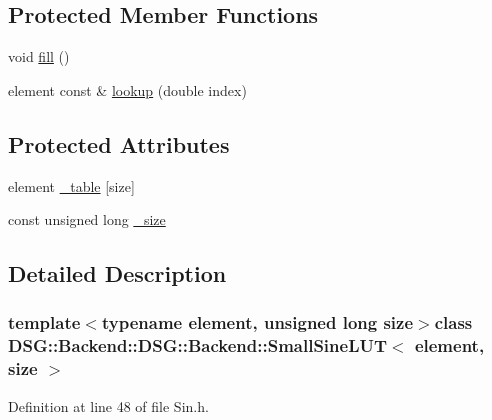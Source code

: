 \subsection*{Protected Member Functions}
\begin{DoxyCompactItemize}
\item 
void \hyperlink{classDSG_1_1Backend_1_1DSG_1_1Backend_1_1SmallSineLUT_aad31185d841e47300bf5b386e2c9e00f}{fill} ()
\item 
element const \& \hyperlink{classDSG_1_1Backend_1_1DSG_1_1Backend_1_1SmallSineLUT_acd4ee07b8be6fbd81b5ce70cd230ca4e}{lookup} (double index)
\end{DoxyCompactItemize}
\subsection*{Protected Attributes}
\begin{DoxyCompactItemize}
\item 
element \hyperlink{classDSG_1_1Backend_1_1DSG_1_1Backend_1_1LUT_a427da4b7eccdfe25e3c1889a8c2fdea6}{\+\_\+table} \mbox{[}size\mbox{]}
\item 
const unsigned long \hyperlink{classDSG_1_1Backend_1_1DSG_1_1Backend_1_1LUT_aa48956aa4debf08fdb517cb751d3e01d}{\+\_\+size}
\end{DoxyCompactItemize}


\subsection{Detailed Description}
\subsubsection*{template$<$typename element, unsigned long size$>$class D\+S\+G\+::\+Backend\+::\+D\+S\+G\+::\+Backend\+::\+Small\+Sine\+L\+U\+T$<$ element, size $>$}



Definition at line 48 of file Sin.\+h.



